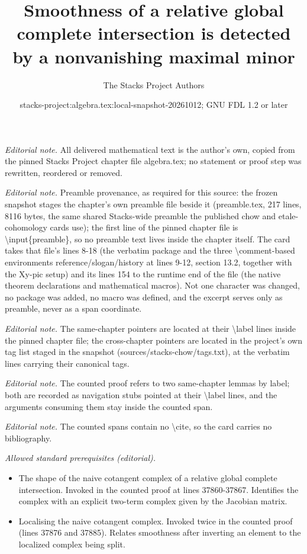 \documentclass[10pt,a4paper]{amsart}
\title{Smoothness of a relative global complete intersection is detected by a nonvanishing maximal minor}
\author{The Stacks Project Authors}
\date{stacks-project:algebra.tex:local-snapshot-20261012; GNU FDL 1.2 or later}
\theoremstyle{plain}
\theoremstyle{definition}
\theoremstyle{remark}
\numberwithin{equation}{subsection}
\begin{document}
\maketitle
\noindent\textit{Editorial note.} All delivered mathematical text is the author's own, copied from the pinned Stacks Project chapter file algebra.tex; no statement or proof step was rewritten, reordered or removed.\par\medskip
\noindent\textit{Editorial note.} Preamble provenance, as required for this source: the frozen snapshot stages the chapter's own preamble file beside it (preamble.tex, 217 lines, 8116 bytes, the same shared Stacks-wide preamble the published chow and etale-cohomology cards use); the first line of the pinned chapter file is \textbackslash{}input\{preamble\}, so no preamble text lives inside the chapter itself. The card takes that file's lines 8-18 (the verbatim package and the three \textbackslash{}comment-based environments reference/slogan/history at lines 9-12, section 13.2, together with the Xy-pic setup) and its lines 154 to the runtime end of the file (the native theorem declarations and mathematical macros). Not one character was changed, no package was added, no macro was defined, and the excerpt serves only as preamble, never as a span coordinate.\par\medskip
\noindent\textit{Editorial note.} The same-chapter pointers are located at their \textbackslash{}label lines inside the pinned chapter file; the cross-chapter pointers are located in the project's own tag list staged in the snapshot (sources/stacks-chow/tags.txt), at the verbatim lines carrying their canonical tags.\par\medskip
\noindent\textit{Editorial note.} The counted proof refers to two same-chapter lemmas by label; both are recorded as navigation stubs pointed at their \textbackslash{}label lines, and the arguments consuming them stay inside the counted span.\par\medskip
\noindent\textit{Editorial note.} The counted spans contain no \textbackslash{}cite, so the card carries no bibliography.\par\medskip
\noindent\textit{Allowed standard prerequisites (editorial).}\begin{itemize}
\item The shape of the naive cotangent complex of a relative global complete intersection. Invoked in the counted proof at lines 37860-37867. Identifies the complex with an explicit two-term complex given by the Jacobian matrix.
\item Localising the naive cotangent complex. Invoked twice in the counted proof (lines 37876 and 37885). Relates smoothness after inverting an element to the localized complex being split.
\end{itemize}\medskip
\end{document}
